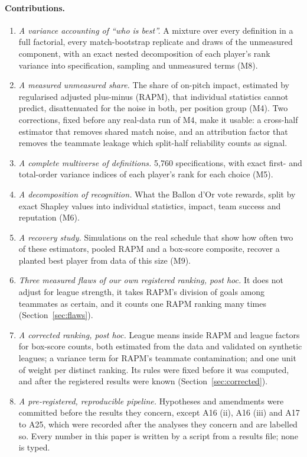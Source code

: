 \documentclass[11pt,a4paper]{article}
\begin{document}
\paragraph{Contributions.}
\begin{enumerate}
  \item \emph{A variance accounting of ``who is best''.} A mixture over every
    definition in a full factorial, every match-bootstrap replicate and draws
    of the unmeasured component, with an exact nested decomposition of each
    player's rank variance into specification, sampling and unmeasured terms
    (M8).
  \item \emph{A measured unmeasured share.} The share of on-pitch impact,
    estimated by regularised adjusted plus-minus (RAPM), that individual
    statistics cannot predict, disattenuated for the noise in both, per
    position group (M4). Two corrections, fixed before any real-data run of
    M4, make it usable: a cross-half estimator that removes shared match noise, and an
    attribution factor that removes the teammate leakage which split-half
    reliability counts as signal.
  \item \emph{A complete multiverse of definitions.} 5,760 specifications,
    with exact first- and total-order variance indices of each player's rank
    for each choice (M5).
  \item \emph{A decomposition of recognition.} What the Ballon d'Or vote
    rewards, split by exact Shapley values into individual statistics, impact,
    team success and reputation (M6).
  \item \emph{A recovery study.} Simulations on the real schedule that show
    how often two of these estimators, pooled RAPM and a box-score composite,
    recover a planted best player from data of this size (M9).
  \item \emph{Three measured flaws of our own registered ranking, post hoc.}
    It does not adjust for league strength, it takes RAPM's division of goals
    among teammates as certain, and it counts one RAPM ranking many times
    (Section~\ref{sec:flaws}).
  \item \emph{A corrected ranking, post hoc.} League means inside RAPM and
    league factors for box-score counts, both estimated from the data and
    validated on synthetic leagues; a variance term for RAPM's teammate
    contamination; and one unit of weight per distinct ranking. Its rules were
    fixed before it was computed, and after the registered results were known
    (Section~\ref{sec:corrected}).
  \item \emph{A pre-registered, reproducible pipeline.} Hypotheses and
    amendments were committed before the results they concern, except
    A16 (ii), A16 (iii) and A17 to A25, which were recorded after the analyses
    they concern and are labelled so. Every number in this paper is written by
    a script from a results file; none is typed.
\end{enumerate}
\end{document}
